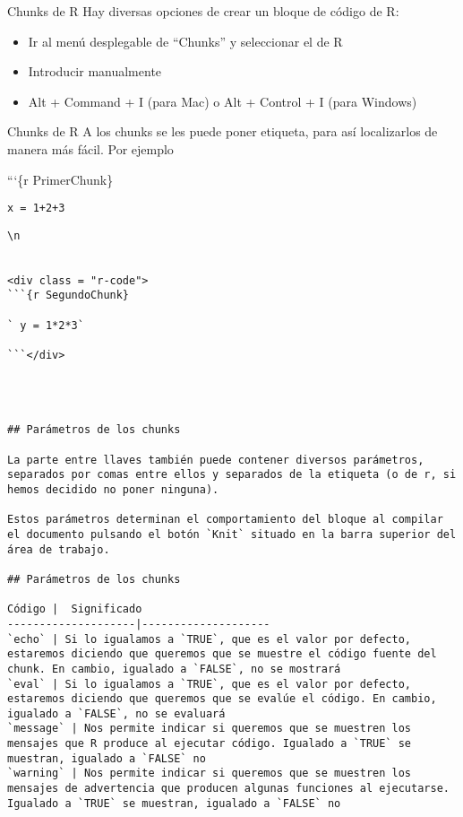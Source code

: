 \documentclass[
  ignorenonframetext,
]{beamer}
\providecommand{\tightlist}{%
  \setlength{\itemsep}{0pt}\setlength{\parskip}{0pt}}
\begin{document}
\begin{frame}{Chunks de R}
\protect\hypertarget{chunks-de-r-1}{}
Hay diversas opciones de crear un bloque de código de R:

\begin{itemize}
\tightlist
\item
  Ir al menú desplegable de ``Chunks'' y seleccionar el de R
\item
  Introducir manualmente
\item
  Alt + Command + I (para Mac) o Alt + Control + I (para Windows)
\end{itemize}
\end{frame}

\begin{frame}[fragile]{Chunks de R}
\protect\hypertarget{chunks-de-r-2}{}
A los chunks se les puede poner etiqueta, para así localizarlos de
manera más fácil. Por ejemplo

```\{r PrimerChunk\}

\texttt{x\ =\ 1+2+3}

\begin{verbatim}
\n


<div class = "r-code">
```{r SegundoChunk}

` y = 1*2*3`

```</div>




## Parámetros de los chunks

La parte entre llaves también puede contener diversos parámetros, separados por comas entre ellos y separados de la etiqueta (o de r, si hemos decidido no poner ninguna).

Estos parámetros determinan el comportamiento del bloque al compilar el documento pulsando el botón `Knit` situado en la barra superior del área de trabajo.

## Parámetros de los chunks

Código |  Significado                                  
--------------------|--------------------
`echo` | Si lo igualamos a `TRUE`, que es el valor por defecto, estaremos diciendo que queremos que se muestre el código fuente del chunk. En cambio, igualado a `FALSE`, no se mostrará
`eval` | Si lo igualamos a `TRUE`, que es el valor por defecto, estaremos diciendo que queremos que se evalúe el código. En cambio, igualado a `FALSE`, no se evaluará
`message` | Nos permite indicar si queremos que se muestren los mensajes que R produce al ejecutar código. Igualado a `TRUE` se muestran, igualado a `FALSE` no
`warning` | Nos permite indicar si queremos que se muestren los mensajes de advertencia que producen algunas funciones al ejecutarse. Igualado a `TRUE` se muestran, igualado a `FALSE` no


\end{verbatim}
\end{frame}
\end{document}
